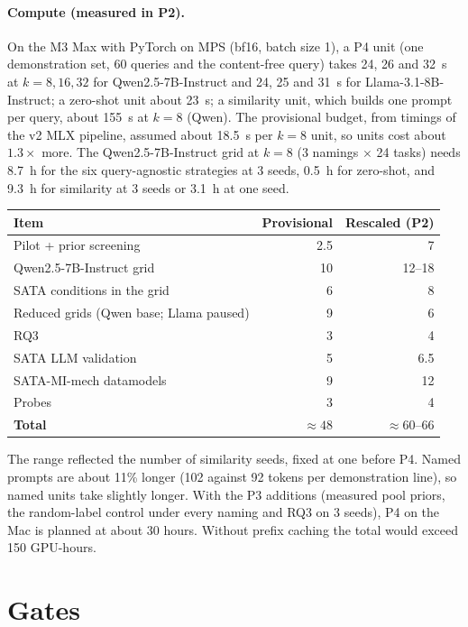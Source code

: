 \documentclass[11pt,a4paper]{article}
\newcommand{\1}{\mathbf{1}}
\theoremstyle{plain}
\theoremstyle{definition}
\theoremstyle{remark}
\begin{document}
\paragraph{Compute (measured in P2).} On the M3 Max with PyTorch on MPS
(bf16, batch size 1), a P4 unit (one demonstration set, 60 queries and the
content-free query) takes 24, 26 and 32~s at $k = 8, 16, 32$ for
Qwen2.5-7B-Instruct and 24, 25 and 31~s for Llama-3.1-8B-Instruct; a
zero-shot unit about 23~s; a similarity unit, which builds one prompt per
query, about 155~s at $k=8$ (Qwen). The provisional budget, from timings of
the v2 MLX pipeline, assumed about 18.5~s per $k = 8$ unit, so units cost
about $1.3\times$ more. The Qwen2.5-7B-Instruct grid at $k = 8$ (3 namings
$\times$ 24 tasks) needs 8.7~h for the six query-agnostic strategies at 3
seeds, 0.5~h for zero-shot, and 9.3~h for similarity at 3 seeds or 3.1~h at
one seed.

\begin{center}
\begin{tabular}{lrr}
\toprule
\textbf{Item} & \textbf{Provisional} & \textbf{Rescaled (P2)} \\
\midrule
Pilot + prior screening & 2.5 & 7 \\
Qwen2.5-7B-Instruct grid & 10 & 12--18 \\
SATA conditions in the grid & 6 & 8 \\
Reduced grids (Qwen base; Llama paused) & 9 & 6 \\
RQ3 & 3 & 4 \\
SATA LLM validation & 5 & 6.5 \\
SATA-MI-mech datamodels & 9 & 12 \\
Probes & 3 & 4 \\
\midrule
\textbf{Total} & $\approx 48$ & $\approx 60$--$66$ \\
\bottomrule
\end{tabular}
\end{center}
The range reflected the number of similarity seeds, fixed at one before
P4. Named prompts are about 11\% longer (102 against 92 tokens per
demonstration line), so named units take slightly longer. With the P3
additions (measured pool priors, the random-label control under every naming
and RQ3 on 3 seeds), P4 on the Mac is planned at about 30 hours. Without
prefix caching the total would exceed 150 GPU-hours.

\section{Gates}
\end{document}

